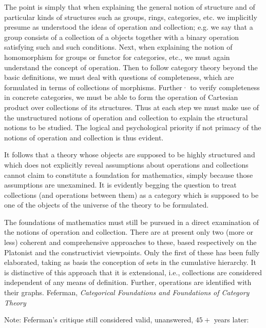 \documentclass[11pt,openany]{book}
\begin{document}
\begin{boxquote}
The point is simply that when explaining the general notion of
structure and of particular kinds of structures such as groups, rings,
categories, etc. we implicitly presume as understood the ideas of
operation and collection; e.g. we say that a group consists of a collection
of a objects together with a binary operation satisfying such and
such conditions. Next, when explaining the notion of homomorphism
for groups or functor for categories, etc., we must again understand the
concept of operation. Then to follow category theory beyond the basic
definitions, we must deal with questions of completeness, which are
formulated in terms of collections of morphisms. Further· to verify
completeness in concrete categories, we must be able to form the
operation of Cartesian product over collections of its structures. Thus
at each step we must make use of the unstructured notions of operation
and collection to explain the structural notions to be studied. The
logical and psychological priority if not primacy of the notions of
operation and collection is thus evident.
\par
It follows that a theory whose objects are supposed to be highly
structured and which does not explicitly reveal assumptions about
operations and collections cannot claim to constitute a foundation for
mathematics, simply because those assumptions are unexamined. It is
evidently begging the question to treat collections (and operations
between them) as a category which is supposed to be one of the objects
of the universe of the theory to be formulated.
\par
The foundations of mathematics must still be pursued in a direct
examination of the notions of operation and collection. There are at
present only two (more or less) coherent and comprehensive approaches
to these, based respectively on the Platonist and the constructivist
viewpoints. Only the first of these has been fully elaborated,
taking as basis the conception of sets in the cumulative hierarchy. It is
distinctive of this approach that it is extensional, i.e., collections are
considered independent of any means of definition. Further, operations
are identified with their graphs.
\tcblower
{Feferman,
\textit{Categorical Foundations and Foundations of Category 
Theory}~\cite{feferman_1977_categorical}}
\end{boxquote}

Note: Feferman's critique still considered valid, unanswered,
$45+$ years later:
\end{document}
